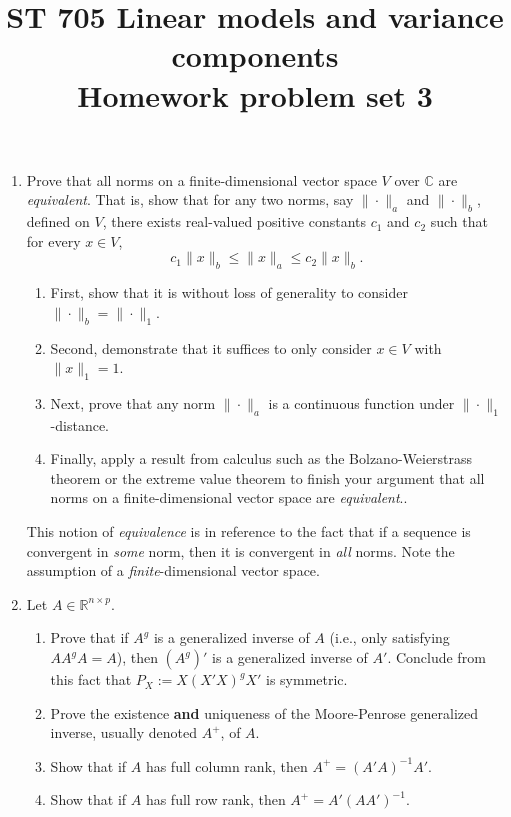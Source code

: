 \documentclass[11pt]{article}
\title{ST 705 Linear models and variance components \\ 
        Homework problem set 3}
\begin{document}
\maketitle

\begin{enumerate}

\item Prove that all norms on a finite-dimensional vector space $V$ over $\mathbb{C}$ are {\em equivalent}.  That is, show that for any two norms, say $\|\cdot\|_{a}$ and $\|\cdot\|_{b}$, defined on $V$, there exists real-valued positive constants $c_{1}$ and $c_{2}$ such that for every $x \in V$,
\[
c_{1}\|x\|_{b} \le \|x\|_{a} \le c_{2}\|x\|_{b}.
\]
\begin{enumerate}
\item First, show that it is without loss of generality to consider $\|\cdot\|_{b} = \|\cdot\|_{1}$.
\item Second, demonstrate that it suffices to only consider $x \in V$ with $\|x\|_{1} = 1$.
\item Next, prove that any norm $\|\cdot\|_{a}$ is a continuous function under $\|\cdot\|_{1}$-distance.
\item Finally, apply a result from calculus such as the Bolzano-Weierstrass theorem or the extreme value theorem to finish your argument that all norms on a finite-dimensional vector space are {\em equivalent}..
\end{enumerate}
This notion of {\em equivalence} is in reference to the fact that if a sequence is convergent in {\em some} norm, then it is convergent in {\em all} norms.  Note the assumption of a {\em finite}-dimensional vector space.

\item Let $A \in \mathbb{R}^{n\times p}$.
\begin{enumerate}
\item Prove that if $A^{g}$ is a generalized inverse of $A$ (i.e., only satisfying $AA^{g}A = A$), then $(A^{g})'$ is a generalized inverse of $A'$.  Conclude from this fact that $P_{X} := X(X'X)^{g}X'$ is symmetric.
\item Prove the existence \textbf{and} uniqueness of the Moore-Penrose generalized inverse, usually denoted $A^{+}$, of $A$.
\item Show that if $A$ has full column rank, then $A^{+} = (A'A)^{-1}A'$.  
\item Show that if $A$ has full row rank, then $A^{+} = A'(AA')^{-1}$.
\end{enumerate}


\end{enumerate}
\end{document}
